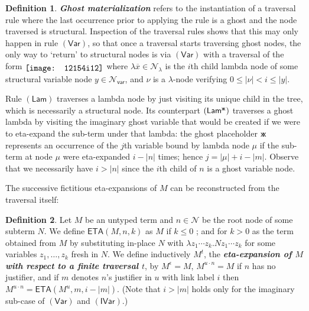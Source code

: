 \documentclass[xchauthor,chkrefs,GCNS,amsmath,amsthm,rotating,leaveRGB]{tcsg}
\renewcommand{\index}[1]{}
\theoremstyle{plain}
\theoremstyle{definition}
\newtheorem{definition}{Definition}[section]
\newcommand{\Nodes}{\mathcal{N}}
\newcommand{\NodesVar}{\Nodes_{\mathsf{var}}}
\newcommand{\NodesLmd}{\Nodes_\lambda}
\newcommand{\ghostvar}{\mathsf{x\mkern-5mu x}}
\begin{document}
\begin{definition}
{\textbf{\emph{Ghost materialization}}}\index{Ghost materialization} refers
to the instantiation of a traversal rule where the last occurrence prior to
applying the rule is a ghost and the node traversed is structural. Inspection
of the traversal rules shows that this may only happen in rule
$\mathsf{(Var)}$, so that once a traversal starts traversing ghost nodes, the
only way to `return' to structural nodes is via $\mathsf{(Var)}$ with a
traversal of the form $\raisebox{-2pt}{\texttt{[image: 12154i12]}}$ where $\lambda
\overline{x} \in \NodesLmd $ is the $i$th child lambda node of some
structural variable node $y \in \NodesVar $, and $\nu $ is a $\lambda $-node
verifying $0\leq |\nu | < i \leq |y|$.
\end{definition}

Rule $\mathsf{(Lam)}$ traverses a lambda node by just visiting its unique
child  in the tree, which is necessarily a structural node. Its counterpart
$\mathsf{(Lam^{\ghostvar}  )}$ traverses a ghost lambda by visiting the
imaginary ghost variable that would be created if we were to eta-expand the
sub-term under that lambda: the ghost placeholder $\ghostvar $ represents an
occurrence of the $j$th variable bound by lambda node $\mu $ if the sub-term
at node $\mu $ were eta-expanded $i-|n|$ times; hence $j = |\mu | + i - |m|$.
Observe that we necessarily have $i>|n|$ since the $i$th child of $n$ is a
ghost variable node.

The successive fictitious eta-expansions of $M$ can be reconstructed from the
traversal itself:

\begin{definition}\label{def:onthefly_etaexpansion}
Let $M$ be an untyped term and $n\in \Nodes $ be the root node of some
subterm $N$. We define $\mathsf{ETA}(M, n, k)$ as $M$ if $k \leq 0$ ; and for
$k> 0$ as the term obtained from $M$ by substituting in-place $N$ with
$\lambda z_{1} \cdots z_{k}. N z_{1} \cdots z_{k}$ for some variables $z_{1},
\ldots , z_{k}$ fresh in $N$. We define inductively $M^{t}$,  the
\textbf{\emph{eta-expansion of $M$ with respect to a finite traversal
$t$}}\index{eta-expansion of $M$ with respect to a finite traversal $t$}, by
$M^\epsilon = M$, $M^{u \cdot n} = M$ if $n$ has no justifier, and if $m$
denotes $n$'s justifier in $u$ with link label $i$ then $M^{u \cdot n} =
\mathsf{ETA}(M^{u}, m, i-|m|)$. (Note that $i>|m|$ holds only for the
imaginary sub-case of $\mathsf{(Var)}$ and $\mathsf{(IVar)}$.)
\end{definition}
\end{document}
